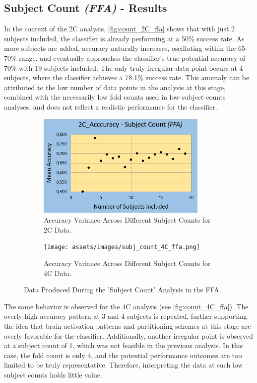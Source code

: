 \subsection{Subject Count \textit{(FFA)} - Results}

In the context of the \gls{2C} analysis, \autoref{fig:count_2C_ffa} shows that with just 2 subjects included, the classifier is already performing at a 50\% success rate. As more subjects are added, accuracy naturally increases, oscillating within the 65-70\% range, and eventually approaches the classifier's true potential accuracy of 70\% with 19 subjects included. The only truly irregular data point occurs at 4 subjects, where the classifier achieves a 78.1\% success rate. This anomaly can be attributed to the low number of data points in the analysis at this stage, combined with the necessarily low fold counts used in low subject counts analyses, and does not reflect a realistic performance for the classifier.

\begin{figure}[htbp]
 	\centering
	\begin{subfigure}{0.49\textwidth}
		\centering
		\includegraphics[width = 0.9\textwidth, height = 5cm]{assets/images/subj_count_2C_ffa.png}
		\caption{Accuracy Variance Across Different Subject Counts for \gls{2C} Data.}
		\label{fig:count_2C_ffa}
	\end{subfigure}
	\hfill
	\begin{subfigure}{0.49\textwidth}
		\centering
	 	\texttt{[image: assets/images/subj\_count\_4C\_ffa.png]}
		\caption{Accuracy Variance Across Different Subject Counts for \gls{4C} Data.}
		\label{fig:count_4C_ffa}
	\end{subfigure}
	\caption[Accuracies Across Subject Counts For The FFA]{Data Produced During the 'Subject Count' Analysis in the \gls{FFA}.}
 	\label{fig:count_ffa}
\end{figure} 

The same behavior is observed for the \gls{4C} analysis (see \autoref{fig:count_4C_ffa}). The overly high accuracy pattern at 3 and 4 subjects is repeated, further supporting the idea that brain activation patterns and partitioning schemes at this stage are overly favorable for the classifier. Additionally, another irregular point is observed at a subject count of 1, which was not feasible in the previous analysis. In this case, the fold count is only 4, and the potential performance outcomes are too limited to be truly representative. Therefore, interpreting the data at such low subject counts holds little value.

